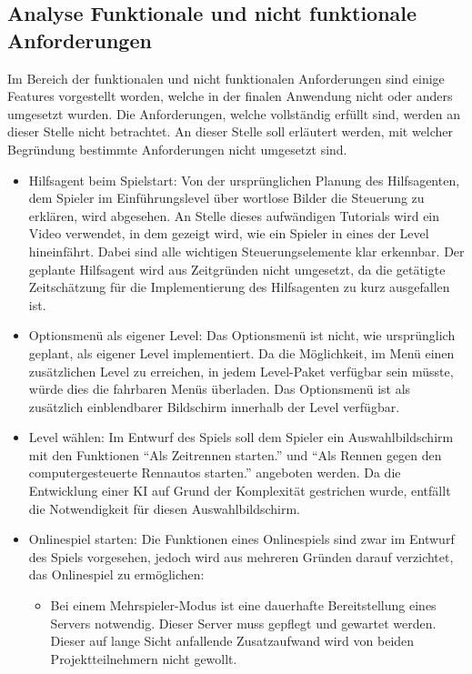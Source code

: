 \subsection{Analyse Funktionale und nicht funktionale Anforderungen}
Im Bereich der funktionalen und nicht funktionalen Anforderungen sind einige Features vorgestellt worden, welche in der finalen Anwendung nicht oder anders umgesetzt wurden. Die Anforderungen, welche vollständig erfüllt sind, werden an dieser Stelle nicht betrachtet. An dieser Stelle soll erläutert werden, mit welcher Begründung bestimmte Anforderungen nicht umgesetzt sind.
\begin{itemize}
    \item{Hilfsagent beim Spielstart: Von der ursprünglichen Planung des Hilfsagenten, dem Spieler im Einführungslevel über wortlose Bilder die Steuerung zu erklären, wird abgesehen. An Stelle dieses aufwändigen Tutorials wird ein Video verwendet, in dem gezeigt wird, wie ein Spieler in eines der Level hineinfährt. Dabei sind alle wichtigen Steuerungselemente klar erkennbar. Der geplante Hilfsagent wird aus Zeitgründen nicht umgesetzt, da die getätigte Zeitschätzung für die Implementierung des Hilfsagenten zu kurz ausgefallen ist.}
    \item{Optionsmenü als eigener Level: Das Optionsmenü ist nicht, wie ursprünglich geplant, als eigener Level implementiert. Da die Möglichkeit, im Menü einen zusätzlichen Level zu erreichen, in jedem Level-Paket verfügbar sein müsste, würde dies die fahrbaren Menüs überladen. Das Optionsmenü ist als zusätzlich einblendbarer Bildschirm innerhalb der Level verfügbar.}
    \item{Level wählen: Im Entwurf des Spiels soll dem Spieler ein Auswahlbildschirm mit den Funktionen \enquote{Als Zeitrennen starten.} und \enquote{Als Rennen gegen den computergesteuerte Rennautos starten.} angeboten werden. Da die Entwicklung einer KI auf Grund der Komplexität gestrichen wurde, entfällt die Notwendigkeit für diesen Auswahlbildschirm.}
    \item{Onlinespiel starten: Die Funktionen eines Onlinespiels sind zwar im Entwurf des Spiels vorgesehen, jedoch wird aus mehreren Gründen darauf verzichtet, das Onlinespiel zu ermöglichen:}
    \begin{itemize}
        \item{Bei einem Mehrspieler-Modus ist eine dauerhafte Bereitstellung eines Servers notwendig. Dieser Server muss gepflegt und gewartet werden. Dieser auf lange Sicht anfallende Zusatzaufwand wird von beiden Projektteilnehmern nicht gewollt.}

\end{itemize}
\end{itemize}
